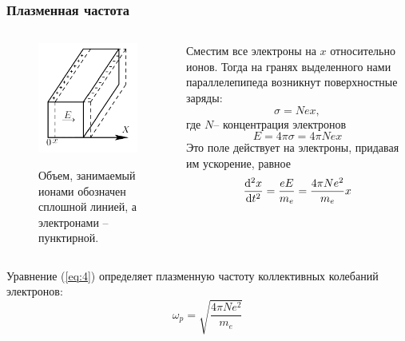 \documentclass[10pt,pdf,hyperref={unicode}, dvipsnames]{beamer}
\begin{document}
\begin{frame}[t]\frametitle{Плазменная частота}
\begin{minipage}[0.2\textheight]{\textwidth}
	\begin{columns}[T]

		\begin{column}{0.4\textwidth}
			\begin{figure}[tr]
				\vspace{0pt}
				\centering
				\includegraphics[]{fig/plasmfreq}
				\vspace{-15pt}
				\label{fig:plasmfreq}
				\caption{Объем, занимаемый ионами обозначен сплошной линией, а электронами -- пунктирной.}
			\end{figure}
		\end{column}


		\begin{column}{0.6\textwidth}
			Сместим все электроны на $x$ относительно ионов. Тогда на гранях выделенного нами параллелепипеда возникнут поверхностные заряды:
			\begin{equation}
			\sigma = Nex,
			\end{equation}
			где $N$-- концентрация электронов
			\begin{equation}
				E=4\pi\sigma=4\pi Nex
			\end{equation}
			Это поле действует на электроны, придавая им ускорение, равное
			\begin{equation}
				\label{eq:4}
				\dv[2]{x}{t}=\frac{eE}{m_e}=\frac{4\pi N e^2}{m_e}x
			\end{equation}
		\end{column}

	\end{columns}
\end{minipage}
\vfill
Уравнение (\ref{eq:4}) определяет плазменную частоту коллективных колебаний электронов:
\begin{equation}
	\omega_p=\sqrt{\frac{4\pi N e^2}{m_e}}
\end{equation}



\end{frame}
\end{document}
